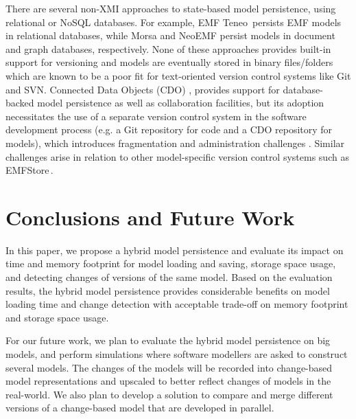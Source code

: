 \documentclass[10pt,conference]{IEEEtran}
\begin{document}
 There are several non-XMI approaches to state-based model persistence, using relational or NoSQL databases. For example, EMF Teneo\,\cite{eclipse2017teneo} persists EMF models in relational databases, while Morsa \cite{DBLP:conf/models/Espinazo-PaganCM11} and NeoEMF \cite{daniel2016neoemf} persist models in document and graph databases, respectively.  None of these approaches provides built-in support for versioning and models are eventually stored in binary files/folders which are known to be a poor fit for text-oriented version control systems like Git and SVN. Connected Data Objects (CDO) \cite{eclipse2017cdo}, provides support for database-backed model persistence as well as collaboration facilities, but its adoption necessitates the use of a separate version control system in the software development process (e.g. a Git repository for code and a CDO repository for models), which introduces fragmentation and administration challenges \cite{barmpis2014evaluation}. Similar challenges arise in relation to other model-specific version control systems such as EMFStore\,\cite{koegel2010emfstore}.

\section{Conclusions and Future Work}
\label{sec:conlcusions_and_future_work}
In this paper, we propose a hybrid model persistence and evaluate its impact on time and memory footprint for model loading and saving, storage space usage, and detecting changes of versions of the same model. Based on the evaluation results, the hybrid model persistence provides considerable benefits on model loading time and change detection with acceptable trade-off on memory footprint and storage space usage.

For our future work, we plan to evaluate the hybrid model persistence on big models, and perform simulations where software modellers are asked to construct several models. The changes of the models will be recorded into change-based model representations and upscaled to better reflect changes of models in the real-world. We also plan to develop a solution to compare and merge different versions of a change-based model that are developed in parallel.  
\end{document}
